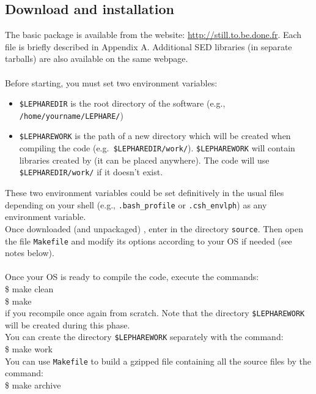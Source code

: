 \documentclass[12pt]{article}
\begin{document}
\subsection{Download and installation}\label{subsect:installation}
%
The basic package is available from the website:  \url{http://still.to.be.done.fr}.
Each file is briefly described in Appendix A. Additional SED libraries (in separate tarballs) are also available on the same webpage. \\
\\
Before starting, you must set two environment variables:
\begin{itemize}
\item \texttt{\$LEPHAREDIR} is the root directory of the software (e.g., \texttt{/home/yourname/LEPHARE/})
\item \texttt{\$LEPHAREWORK} is the path of a new directory which will be created when compiling the code (e.g.~\texttt{\$LEPHAREDIR/work/}). \texttt{\$LEPHAREWORK} will contain libraries created by \lp (it can be placed anywhere). 
The code will use \texttt{\$LEPHAREDIR/work/} if it doesn't exist.
\end{itemize}
These two environment variables could be set definitively in the usual files depending on your shell (e.g., \texttt{.bash\_profile} or \texttt{.csh\_envlph}) as any environment variable. \\
 
Once downloaded (and unpackaged) \lp, enter in the directory \texttt{source}. Then open the file \texttt{Makefile} and modify its options according to your OS if needed (see notes below). \\
\\
Once your OS is ready to compile the code, execute the commands:\\
\$ make clean\\
\$ make\\
if you recompile once again from scratch. 
Note that the directory \texttt{\$LEPHAREWORK} will be created during this phase. \\
You can create the directory \texttt{\$LEPHAREWORK} separately with the command:\\
\$ make work\\

You can use \texttt{Makefile} to build a gzipped file containing all the source files by the command:\\
\$ make archive
\\
\end{document}
